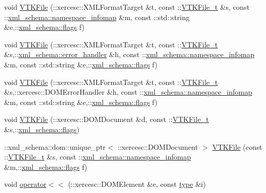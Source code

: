 \begin{DoxyCompactItemize}
\item 
void \hyperlink{vtk-unstructured_8cpp_aa29105a5170680695be352fa0e00341d}{V\+T\+K\+File} (\+::xercesc\+::\+X\+M\+L\+Format\+Target \&t, const \+::\hyperlink{classVTKFile__t}{V\+T\+K\+File\+\_\+t} \&s, const \+::\hyperlink{namespacexml__schema_a17712c8260e03226f0a9e4d21ab78f42}{xml\+\_\+schema\+::namespace\+\_\+infomap} \&m, const \+::std\+::string \&e,\+::\hyperlink{namespacexml__schema_a0612287d030cb2732d31a45b258fdc87}{xml\+\_\+schema\+::flags} f)
\item 
void \hyperlink{vtk-unstructured_8cpp_ab09b4a244a093deff01c76e0d066b039}{V\+T\+K\+File} (\+::xercesc\+::\+X\+M\+L\+Format\+Target \&t, const \+::\hyperlink{classVTKFile__t}{V\+T\+K\+File\+\_\+t} \&s,\+::\hyperlink{namespacexml__schema_a0a5d9528e9175cedf199984a8bb64d62}{xml\+\_\+schema\+::error\+\_\+handler} \&h, const \+::\hyperlink{namespacexml__schema_a17712c8260e03226f0a9e4d21ab78f42}{xml\+\_\+schema\+::namespace\+\_\+infomap} \&m, const \+::std\+::string \&e,\+::\hyperlink{namespacexml__schema_a0612287d030cb2732d31a45b258fdc87}{xml\+\_\+schema\+::flags} f)
\item 
void \hyperlink{vtk-unstructured_8cpp_a08394e720690e6ac839c4c06f06fe1c7}{V\+T\+K\+File} (\+::xercesc\+::\+X\+M\+L\+Format\+Target \&t, const \+::\hyperlink{classVTKFile__t}{V\+T\+K\+File\+\_\+t} \&s,\+::xercesc\+::\+D\+O\+M\+Error\+Handler \&h, const \+::\hyperlink{namespacexml__schema_a17712c8260e03226f0a9e4d21ab78f42}{xml\+\_\+schema\+::namespace\+\_\+infomap} \&m, const \+::std\+::string \&e,\+::\hyperlink{namespacexml__schema_a0612287d030cb2732d31a45b258fdc87}{xml\+\_\+schema\+::flags} f)
\item 
void \hyperlink{vtk-unstructured_8cpp_a5303826a26dc8b0981ea314365205514}{V\+T\+K\+File} (\+::xercesc\+::\+D\+O\+M\+Document \&d, const \+::\hyperlink{classVTKFile__t}{V\+T\+K\+File\+\_\+t} \&s,\+::\hyperlink{namespacexml__schema_a0612287d030cb2732d31a45b258fdc87}{xml\+\_\+schema\+::flags})
\item 
\+::xml\+\_\+schema\+::dom\+::unique\+\_\+ptr$<$ \+::xercesc\+::\+D\+O\+M\+Document $>$ \hyperlink{vtk-unstructured_8cpp_a187ca2ef68f36ed0ff9970728665f8f6}{V\+T\+K\+File} (const \+::\hyperlink{classVTKFile__t}{V\+T\+K\+File\+\_\+t} \&s, const \+::\hyperlink{namespacexml__schema_a17712c8260e03226f0a9e4d21ab78f42}{xml\+\_\+schema\+::namespace\+\_\+infomap} \&m,\+::\hyperlink{namespacexml__schema_a0612287d030cb2732d31a45b258fdc87}{xml\+\_\+schema\+::flags} f)
\item 
void \hyperlink{vtk-unstructured_8cpp_a39982a892c5c712b9ceaf5451fc6f4ad}{operator$<$$<$} (\+::xercesc\+::\+D\+O\+M\+Element \&e, const \hyperlink{classtype}{type} \&i)

\end{DoxyCompactItemize}
